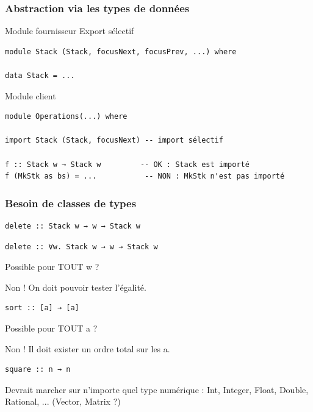 \documentclass[10pt]{beamer}
\begin{document}
\begin{frame}[fragile]
\frametitle{Abstraction via les types de données}
\begin{block}
{Module fournisseur}
Export sélectif
\begin{verbatim}
module Stack (Stack, focusNext, focusPrev, ...) where

data Stack = ...
\end{verbatim}
\end{block}
\begin{block}
{Module client}
\begin{verbatim}
module Operations(...) where

import Stack (Stack, focusNext) -- import sélectif

f :: Stack w → Stack w         -- OK : Stack est importé
f (MkStk as bs) = ...           -- NON : MkStk n'est pas importé
\end{verbatim}
\end{block}
\end{frame}



\begin{frame}[fragile]
\frametitle{Besoin de classes de types}
\begin{verbatim}
delete :: Stack w → w → Stack w
\end{verbatim}

\pause

\begin{verbatim}
delete :: ∀w. Stack w → w → Stack w
\end{verbatim}

Possible pour TOUT w ?

\pause

Non ! On doit pouvoir tester l'égalité.

\pause

\begin{verbatim}
sort :: [a] → [a]
\end{verbatim}

Possible pour TOUT a ?

\pause

Non ! Il doit exister un ordre total sur les a.

\pause

\begin{verbatim}
square :: n → n
\end{verbatim}

Devrait marcher sur n'importe quel type numérique : Int, Integer, Float,
Double, Rational, ... (Vector, Matrix ?)

\end{frame}
\end{document}
